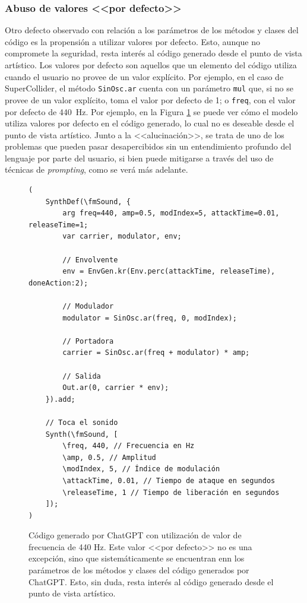 \subsubsection{Abuso de valores <<por defecto>>}
Otro defecto observado con relación a los parámetros de los métodos y clases del código es la propensión a utilizar valores por defecto. Esto, aunque no compromete la seguridad, resta interés al código generado desde el punto de vista artístico. Los valores por defecto son aquellos que un elemento del código utiliza cuando el usuario no provee de un valor explícito. Por ejemplo, en el caso de SuperCollider, el método \texttt{SinOsc.ar} cuenta con un parámetro \texttt{mul} que, si no se provee de un valor explícito, toma el valor por defecto de 1; o \texttt{freq}, con el valor por defecto de \SI{440}{\hertz}. Por ejemplo, en la Figura \ref{fig:ChatGPT_valores_por_defecto} se puede ver cómo el modelo utiliza valores por defecto en el código generado, lo cual no es deseable desde el punto de vista artístico. Junto a la <<alucinación>>, se trata de uno de los problemas que pueden pasar desapercibidos sin un entendimiento profundo del lenguaje por parte del usuario, si bien puede mitigarse a través del uso de técnicas de \textit{prompting}, como se verá más adelante.

\begin{figure}[H]
    \caption[]{Código generado por ChatGPT con utilización de valor de frecuencia de 440 Hz. Este valor <<por defecto>> no es una excepción, sino que sistemáticamente se encuentran enn los parámetros de los métodos y clases del código generados por ChatGPT. Esto, sin duda, resta interés al código generado desde el punto de vista artístico.}
    \centering
    \begin{lstlisting}[style=SuperCollider-IDE, basicstyle=\footnotesize\ttfamily, numbers=none]
(
    SynthDef(\fmSound, {
        arg freq=440, amp=0.5, modIndex=5, attackTime=0.01, releaseTime=1;
        var carrier, modulator, env;
    
        // Envolvente
        env = EnvGen.kr(Env.perc(attackTime, releaseTime), doneAction:2);
    
        // Modulador
        modulator = SinOsc.ar(freq, 0, modIndex);
    
        // Portadora
        carrier = SinOsc.ar(freq + modulator) * amp;
    
        // Salida
        Out.ar(0, carrier * env);
    }).add;
    
    // Toca el sonido
    Synth(\fmSound, [
        \freq, 440, // Frecuencia en Hz
        \amp, 0.5, // Amplitud
        \modIndex, 5, // Índice de modulación
        \attackTime, 0.01, // Tiempo de ataque en segundos
        \releaseTime, 1 // Tiempo de liberación en segundos
    ]);
) 
    \end{lstlisting}
    \label{fig:ChatGPT_valores_por_defecto}
\end{figure}



